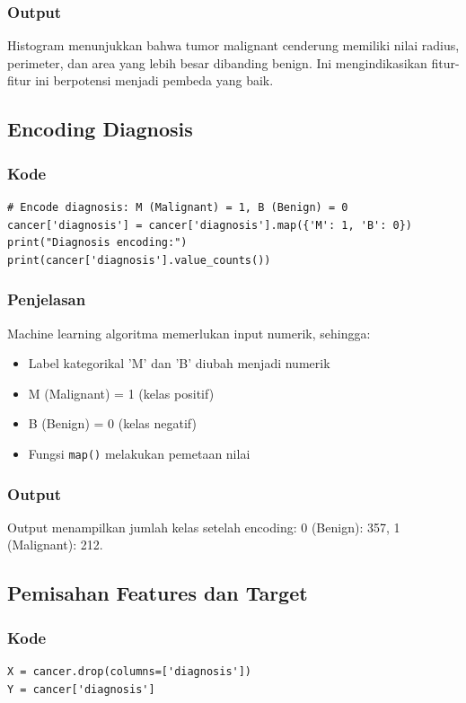 \documentclass[12pt,a4paper]{article}
\begin{document}
\subsubsection{Output}
Histogram menunjukkan bahwa tumor malignant cenderung memiliki nilai radius, perimeter, dan area yang lebih besar dibanding benign. Ini mengindikasikan fitur-fitur ini berpotensi menjadi pembeda yang baik.

\subsection{Encoding Diagnosis}

\subsubsection{Kode}
\begin{lstlisting}[style=pythonstyle]
# Encode diagnosis: M (Malignant) = 1, B (Benign) = 0
cancer['diagnosis'] = cancer['diagnosis'].map({'M': 1, 'B': 0})
print("Diagnosis encoding:")
print(cancer['diagnosis'].value_counts())
\end{lstlisting}

\subsubsection{Penjelasan}
Machine learning algoritma memerlukan input numerik, sehingga:
\begin{itemize}
    \item Label kategorikal 'M' dan 'B' diubah menjadi numerik
    \item M (Malignant) = 1 (kelas positif)
    \item B (Benign) = 0 (kelas negatif)
    \item Fungsi \texttt{map()} melakukan pemetaan nilai
\end{itemize}

\subsubsection{Output}
Output menampilkan jumlah kelas setelah encoding: 0 (Benign): 357, 1 (Malignant): 212.

\subsection{Pemisahan Features dan Target}

\subsubsection{Kode}
\begin{lstlisting}[style=pythonstyle]
X = cancer.drop(columns=['diagnosis'])
Y = cancer['diagnosis']
\end{lstlisting}
\end{document}
